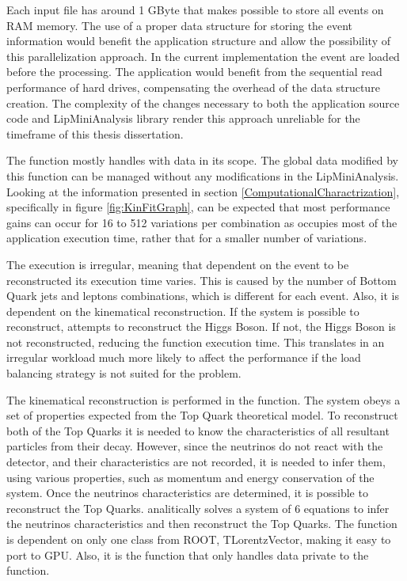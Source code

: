 Each input file has around 1 GByte that makes possible to store all events on RAM memory. The use of a proper data structure for storing the event information would benefit the application structure and allow the possibility of this parallelization approach. In the current implementation the event are loaded before the processing. The application would benefit from the sequential read performance of hard drives, compensating the overhead of the data structure creation. The complexity of the changes necessary to both the application source code and LipMiniAnalysis library render this approach unreliable for the timeframe of this thesis dissertation.

The \ttDilepKinFit function mostly handles with data in its scope. The global data modified by this function can be managed without any modifications in the LipMiniAnalysis. Looking at the information presented in section \ref{ComputationalCharactrization}, specifically in figure \ref{fig:KinFitGraph}, can be expected that most performance gains can occur for 16 to 512 variations per combination as \ttDilepKinFit occupies most of the application execution time, rather that for a smaller number of variations.

The \ttDilepKinFit execution is irregular, meaning that dependent on the event to be reconstructed its execution time varies. This is caused by the number of Bottom Quark jets and leptons combinations, which is different for each event. Also, it is dependent on the kinematical reconstruction. If the \ttbar system is possible to reconstruct, \ttDilepKinFit attempts to reconstruct the Higgs Boson. If not, the Higgs Boson is not reconstructed, reducing the function execution time. This translates in an irregular workload much more likely to affect the performance if the load balancing strategy is not suited for the problem.

The kinematical reconstruction is performed in the \dilep function. The \ttbar system obeys a set of properties expected from the Top Quark theoretical model. To reconstruct both of the Top Quarks it is needed to know the characteristics of all resultant particles from their decay. However, since the neutrinos do not react with the detector, and their characteristics are not recorded, it is needed to infer them, using various properties, such as momentum and energy conservation of the system. Once the neutrinos characteristics are determined, it is possible to reconstruct the Top Quarks. \dilep analitically solves a system of 6 equations to infer the neutrinos characteristics and then reconstruct the Top Quarks. The function is dependent on only one class from ROOT, TLorentzVector, making it easy to port to GPU. Also, it is the function that only handles data private to the function.

